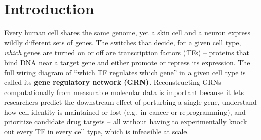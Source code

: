 \documentclass{article}
\theoremstyle{plain}
\theoremstyle{definition}
\begin{document}

\section{Introduction}
\label{sec:intro}

Every human cell shares the same genome, yet a skin cell and a neuron express
wildly different sets of genes. The switches that decide, for a given cell type,
\emph{which} genes are turned on or off are transcription factors (TFs) --
proteins that bind DNA near a target gene and either promote or repress its
expression. The full wiring diagram of ``which TF regulates which gene'' in a
given cell type is called its \textbf{gene regulatory network (GRN)}.
Reconstructing GRNs computationally from measurable molecular data is important
because it lets researchers predict the downstream effect of perturbing a single
gene, understand how cell identity is maintained or lost (e.g.\ in cancer or
reprogramming), and prioritize candidate drug targets -- all without having to
experimentally knock out every TF in every cell type, which is infeasible at
scale.
\end{document}
